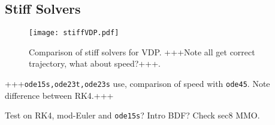 \subsection{Stiff Solvers}
\begin{figure}
	\centering
	\texttt{[image: stiffVDP.pdf]}
	\caption[Stiff Solvers]{Comparison of stiff solvers for VDP. +++Note all get correct trajectory, what about speed?+++.}
	
\end{figure}

+++\texttt{ode15s,ode23t,ode23s} use, comparison of speed with \texttt{ode45}. Note difference between RK4.+++



		Test on RK4, mod-Euler and \texttt{ode15s}? Intro BDF? Check sec8 MMO.

